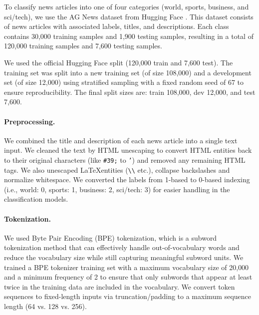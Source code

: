 To classify news articles into one of four categories (world, sports, business, and sci/tech), we use the AG News dataset from Hugging Face \cite{zhang2015character}. This dataset consists of news articles with associated labels, titles, and descriptions. Each class contains 30,000 training samples and 1,900 testing samples, resulting in a total of 120,000 training samples and 7,600 testing samples.

We used the official Hugging Face split (120,000 train and 7,600 test). The training set was split into a new training set (of size 108,000) and a development set (of size 12,000) using stratified sampling with a fixed random seed of 67 to ensure reproducibility. The final split sizes are: train 108,000, dev 12,000, and test 7,600.

\paragraph{Preprocessing.} We combined the title and description of each news article into a single text input. We cleaned the text by HTML unescaping to convert HTML entities back to their original characters (like \texttt{\#39;} to \texttt{'}) and removed any remaining HTML tags. We also unescaped \LaTeX entities (\texttt{\textbackslash\textbackslash} etc.), collapse backslashes and normalize whitespace. We converted the labels from 1-based to 0-based indexing (i.e., world: 0, sports: 1, business: 2, sci/tech: 3) for easier handling in the classification models.

\paragraph{Tokenization.} We used Byte Pair Encoding (BPE) tokenization, which is a subword tokenization method that can effectively handle out-of-vocabulary words and reduce the vocabulary size while still capturing meaningful subword units. We trained a BPE tokenizer training set with a maximum vocabulary size of 20{,}000 and a minimum frequency of 2 to ensure that only subwords that appear at least twice in the training data are included in the vocabulary. We convert token sequences to fixed-length inputs via truncation/padding to a maximum sequence length (64 vs. 128 vs. 256).
